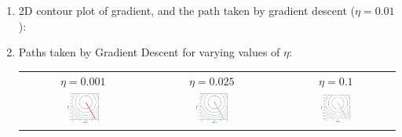 \documentclass[12pt]{article}
\begin{document}
\begin{enumerate}[label=(\alph*)]
    \item \begin{center}2D contour plot of gradient, and the path taken by gradient descent ($\eta = 0.01$): \end{center}

    \clearpage

    \item Paths taken by Gradient Descent for varying values of $\eta$: 
    
    \begin{tabular}{c c c}
        $\eta = 0.001$ & $\eta = 0.025$ & $\eta = 0.1$ \\
        \includegraphics[width=0.28\textwidth]{../Q1/plots/e_contour_001.png} &
        \includegraphics[width=0.28\textwidth]{../Q1/plots/e_contour_025.png} &
        \includegraphics[width=0.28\textwidth]{../Q1/plots/e_contour_1.png} \\
    \end{tabular}


\end{enumerate}
\end{document}
